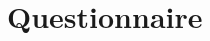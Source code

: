 \documentclass[12pt,english]{article}
\begin{document}


\clearpage
\section{Questionnaire}
\end{document}
